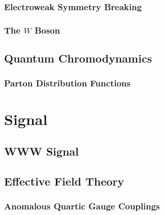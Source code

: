 \subsubsection{Electroweak Symmetry Breaking}
\subsubsection{The $W$ Boson}
\subsection{Quantum Chromodynamics}
\subsubsection{Parton Distribution Functions}
\section{Signal}
\subsection{WWW Signal}
\subsection{Effective Field Theory}
\subsubsection{Anomalous Quartic Gauge Couplings}

